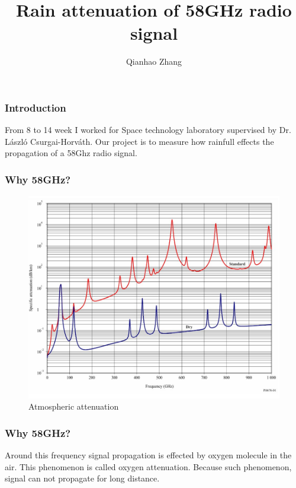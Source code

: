 \documentclass{beamer}
\title{Rain attenuation of 58GHz radio signal}
\author{Qianhao Zhang}
\begin{document}
\frame{\titlepage}

\begin{frame}
\frametitle{Introduction}
From 8 to 14 week I worked for Space technology laboratory supervised by Dr. László Csurgai-Horváth.
Our project is to measure how rainfull effects the propagation of a 58Ghz radio signal.
\end{frame}

\begin{frame}
\frametitle{Why 58GHz?}

\begin{figure}[h!]
    \centering
    \includegraphics[width=0.9\linewidth]{oxygen.jpg}
    \caption{Atmospheric attenuation}
    \label{fig:Atmospheric attenuation}
\end{figure}
    
\end{frame}

\begin{frame}
\frametitle{Why 58GHz?}
Around this frequency
signal propagation is effected by oxygen molecule in the air. This phenomenon is 
called oxygen attenuation. Because such phenomenon, signal can not propagate for long distance.
\end{frame}
\end{document}
